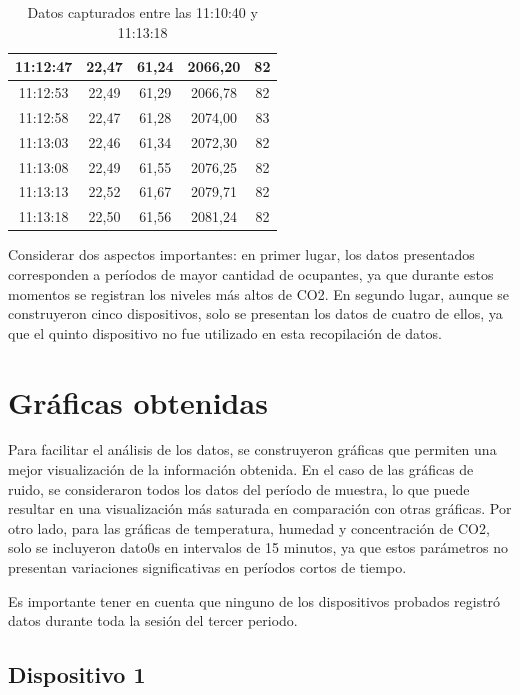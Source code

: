 \documentclass{templateNote}
\begin{document}
\begin{table}[H]
\begin{tabular}{|c|c|c|c|c|}
        11:12:47 & 22,47 & 61,24 & 2066,20 & 82 \\\hline
        11:12:53 & 22,49 & 61,29 & 2066,78 & 82 \\\hline
        11:12:58 & 22,47 & 61,28 & 2074,00 & 83 \\\hline
        11:13:03 & 22,46 & 61,34 & 2072,30 & 82 \\\hline
        11:13:08 & 22,49 & 61,55 & 2076,25 & 82 \\\hline
        11:13:13 & 22,52 & 61,67 & 2079,71 & 82 \\\hline
        11:13:18 & 22,50 & 61,56 & 2081,24 & 82 \\\hline
    \end{tabular}
    \caption{Datos capturados entre las 11:10:40 y 11:13:18}
    \label{tab:data4}
\end{table}

\noindent Considerar dos aspectos importantes: en primer lugar, los datos presentados corresponden a períodos de mayor cantidad de ocupantes, ya que durante estos momentos se registran los niveles más altos de CO2. En segundo lugar, aunque se construyeron cinco dispositivos, solo se presentan los datos de cuatro de ellos, ya que el quinto dispositivo no fue utilizado en esta recopilación de datos.

\newpage
\section{Gráficas obtenidas}
Para facilitar el análisis de los datos, se construyeron gráficas que permiten una mejor visualización de la información obtenida. En el caso de las gráficas de ruido, se consideraron todos los datos del período de muestra, lo que puede resultar en una visualización más saturada en comparación con otras gráficas. Por otro lado, para las gráficas de temperatura, humedad y concentración de CO2, solo se incluyeron dato0s en intervalos de 15 minutos, ya que estos parámetros no presentan variaciones significativas en períodos cortos de tiempo.

Es importante tener en cuenta que ninguno de los dispositivos probados registró datos durante toda la sesión del tercer periodo.

\subsection{Dispositivo 1}
\end{document}
